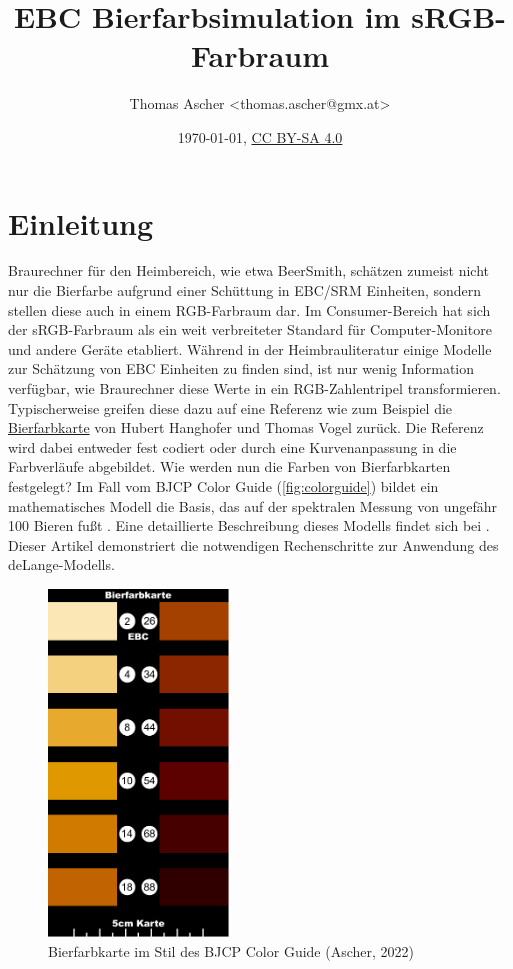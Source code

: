 \documentclass[10pt,a4paper,DIV=12,parskip=half]{scrarticle}
\title{EBC Bierfarbsimulation im sRGB-Farbraum}
\author{Thomas Ascher <thomas.ascher@gmx.at>}
\date{\today, \href{http://creativecommons.org/licenses/by-sa/4.0/}{CC BY-SA 4.0}}
\begin{document}
\maketitle

\section*{Einleitung}

Braurechner für den Heimbereich, wie etwa BeerSmith, schätzen zumeist nicht nur die Bierfarbe aufgrund einer Schüttung in EBC/SRM Einheiten, sondern stellen diese auch in einem RGB-Farbraum dar. Im Consumer-Bereich hat sich der sRGB-Farbraum als ein weit verbreiteter Standard für Computer-Monitore und andere Geräte etabliert. Während in der Heimbrauliteratur einige Modelle zur Schätzung von EBC Einheiten zu finden sind, ist nur wenig Information verfügbar, wie Braurechner diese Werte in ein RGB-Zahlentripel transformieren. Typischerweise greifen diese dazu auf eine Referenz wie zum Beispiel die \href{https://www.bierfarbkarte.de}{Bierfarbkarte} von Hubert Hanghofer und Thomas Vogel zurück. Die Referenz wird dabei entweder fest codiert oder durch eine Kurvenanpassung in die Farbverläufe abgebildet. Wie werden nun die Farben von Bierfarbkarten festgelegt? Im Fall vom BJCP Color Guide (\autoref{fig:colorguide}) bildet ein mathematisches Modell die Basis, das auf der spektralen Messung von ungefähr 100 Bieren fußt \parencite{BJCP}. Eine detaillierte Beschreibung dieses Modells findet sich bei \cite{deLange2016}. Dieser Artikel demonstriert die notwendigen Rechenschritte zur Anwendung des deLange-Modells.

\begin{figure}[H]
	\centering
	\includegraphics[width=4.8cm]{color_guide.pdf}
	\caption{Bierfarbkarte im Stil des BJCP Color Guide (Ascher, 2022)}
	\label{fig:colorguide}
\end{figure}
\end{document}
